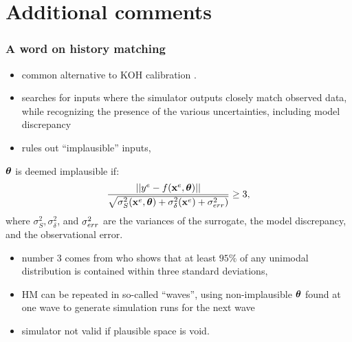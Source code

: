 \documentclass[nopagenumber,9pt]{beamer}
\begin{document}
%  
%  
% 

\section{Additional comments}
\begin{frame}
 \frametitle{A word on history matching}
 
 
 \begin{itemize}
  \item common alternative to KOH calibration \cite{craig1997pressure,vernon2010galaxy, Boukouvalas2014Calibration, Andrianakis2017efficient}.
  \item searches for inputs where the simulator outputs closely match observed data, while recognizing the presence of the various uncertainties, including model discrepancy
  \item rules out ``implausible'' inputs,
  
 \end{itemize}

$\boldsymbol{\theta}$ is deemed implausible if:
\begin{equation}
\frac{||y^{e} - f(\mathbf{x}^e,\boldsymbol{\theta})||}{\sqrt{\sigma^2_S(\mathbf{x}^e,\boldsymbol{\theta}) + \sigma^2_{\delta}(\mathbf{x}^e) + \sigma^2_{err})}} \geq 3,
\label{eq:eqhm}
\end{equation}
where $\sigma^2_S, \sigma^2_{\delta}$, and $\sigma^2_{err}$ are the variances of the surrogate, the model discrepancy, and the observational error.


\begin{itemize}
 \item number 3 comes from \cite{pukelsheim1994three} who shows that at least $95\%$ of any unimodal distribution is contained within three standard deviations,
 \item HM can be repeated in so-called ``waves'', using non-implausible $\boldsymbol{\theta}$ found at one wave to generate simulation runs for the next wave
\item simulator not valid if plausible space is void.
 \end{itemize}
% 

\end{frame}





\end{document}
